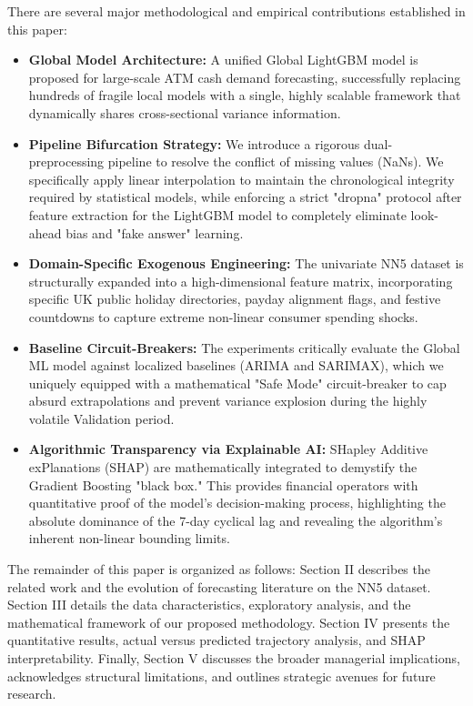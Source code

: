 \documentclass[conference, 12pt, onecolumn]{IEEEtran}
\begin{document}
There are several major methodological and empirical contributions established in this paper:
\begin{itemize}
    \item \textbf{Global Model Architecture:} A unified Global LightGBM model is proposed for large-scale ATM cash demand forecasting, successfully replacing hundreds of fragile local models with a single, highly scalable framework that dynamically shares cross-sectional variance information.
    \item \textbf{Pipeline Bifurcation Strategy:} We introduce a rigorous dual-preprocessing pipeline to resolve the conflict of missing values (NaNs). We specifically apply linear interpolation to maintain the chronological integrity required by statistical models, while enforcing a strict "dropna" protocol after feature extraction for the LightGBM model to completely eliminate look-ahead bias and "fake answer" learning.
    \item \textbf{Domain-Specific Exogenous Engineering:} The univariate NN5 dataset is structurally expanded into a high-dimensional feature matrix, incorporating specific UK public holiday directories, payday alignment flags, and festive countdowns to capture extreme non-linear consumer spending shocks.
    \item \textbf{Baseline Circuit-Breakers:} The experiments critically evaluate the Global ML model against localized baselines (ARIMA and SARIMAX), which we uniquely equipped with a mathematical "Safe Mode" circuit-breaker to cap absurd extrapolations and prevent variance explosion during the highly volatile Validation period.
    \item \textbf{Algorithmic Transparency via Explainable AI:} SHapley Additive exPlanations (SHAP) are mathematically integrated to demystify the Gradient Boosting "black box." This provides financial operators with quantitative proof of the model's decision-making process, highlighting the absolute dominance of the 7-day cyclical lag and revealing the algorithm's inherent non-linear bounding limits.
\end{itemize}

The remainder of this paper is organized as follows: Section II describes the related work and the evolution of forecasting literature on the NN5 dataset. Section III details the data characteristics, exploratory analysis, and the mathematical framework of our proposed methodology. Section IV presents the quantitative results, actual versus predicted trajectory analysis, and SHAP interpretability. Finally, Section V discusses the broader managerial implications, acknowledges structural limitations, and outlines strategic avenues for future research.
\end{document}
